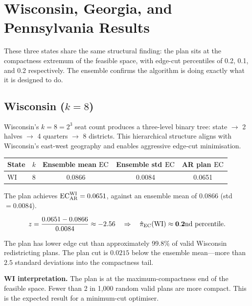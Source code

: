 \section{Wisconsin, Georgia, and Pennsylvania Results}
\label{sec:wi-ga-pa}

These three states share the same structural finding: the \ar{} plan
sits at the compactness extremum of the feasible space, with edge-cut
percentiles of 0.2, 0.1, and 0.2 respectively.  The ensemble confirms
the algorithm is doing exactly what it is designed to do.

\subsection{Wisconsin ($k = 8$)}

Wisconsin's $k = 8 = 2^3$ seat count produces a three-level binary tree:
state $\to$ 2 halves $\to$ 4 quarters $\to$ 8 districts.  This hierarchical
structure aligns with Wisconsin's east-west geography and enables aggressive
edge-cut minimisation.

\begin{center}
\begin{tabular}{lcccc}
\toprule
State & $k$ & Ensemble mean $\mathrm{EC}$ & Ensemble std $\mathrm{EC}$ & AR plan $\mathrm{EC}$ \\
\midrule
WI & 8 & 0.0866 & 0.0084 & 0.0651 \\
\bottomrule
\end{tabular}
\end{center}

The \ar{} plan achieves $\mathrm{EC}_{\mathrm{AR}}^{\mathrm{WI}} = 0.0651$, against
an ensemble mean of $0.0866$ (std $= 0.0084$).

\begin{equation}
  z = \frac{0.0651 - 0.0866}{0.0084} \approx -2.56 \quad\Rightarrow\quad
  \hat\pi_{\mathrm{EC}}(\mathrm{WI}) \approx \mathbf{0.2\text{nd percentile}}.
\end{equation}

The \ar{} plan has lower edge cut than approximately 99.8\% of valid Wisconsin
redistricting plans.  The plan cut is $0.0215$ below the ensemble mean---more
than $2.5$ standard deviations into the compactness tail.

\begin{keybox}
\textbf{WI interpretation.} The \ar{} plan is at the maximum-compactness end
of the feasible space.  Fewer than 2 in 1,000 random valid plans are more
compact.  This is the expected result for a minimum-cut optimiser.
\end{keybox}

